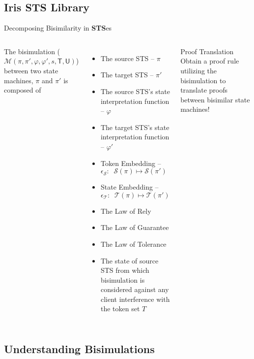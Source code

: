 \documentclass[aspectratio=169,xcolor=dvipsnames]{beamer}
\begin{document}
\subsection{Iris \textbf{STS} Library}
\begin{frame}{Decomposing Bisimilarity in \textbf{STS}es}\scriptsize
\begin{columns}
The bisimulation ($\mathcal{M}(\pi,\pi',\varphi,\varphi',s,\mathsf{T},\mathsf{U})$) between two state machines, $\pi$ and $\pi'$ is composed of 
\begin{itemize}
\item The source STS -- $\pi$
\item The target STS -- $\pi'$
\item The source STS's state interpretation function -- $\varphi$
\item The target STS's state interpretation function -- $\varphi'$
    \item Token Embedding -- $\epsilon_{\mathcal{S}} : \;\; \mathcal{S}(\pi) \mapsto \mathcal{S}(\pi')$
    \item State Embedding -- $\epsilon_{\mathcal{T}} :\;\;  \mathcal{T}(\pi) \mapsto \mathcal{T}(\pi')$
    \item The Law of Rely 
    \item The Law of Guarantee
    \item The Law of Tolerance
    \item The state of source STS from which bisimulation is considered against any client interference with the token set $T$
\end{itemize}
\begin{alertblock}{Proof Translation}
     Obtain a proof rule utilizing the bisimulation to translate proofs between bisimilar state machines!
\end{alertblock}
\end{columns}
\end{frame}
\subsection{Understanding Bisimulations}
\end{document}
